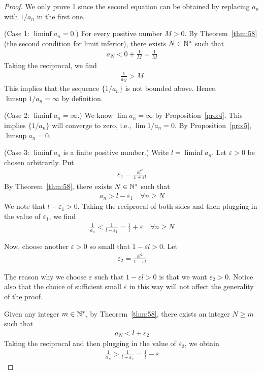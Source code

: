 \documentclass[thmcnt=section, 12pt]{my-elegantbook}
\begin{document}
\begin{proof}
    We only prove 1 since the second equation can be obtained by replacing $a_n$ with $1 / a_n$ in the first one. 

    (Case 1: $\liminf a_n = 0$.) For every positive number $M > 0$. By Theorem~\ref{thm:58} (the second condition for limit inferior), there exists $N \in \mathbb{N}^\ast$ such that 
    \begin{align*}
        a_N < 0 + \frac{1}{M} = \frac{1}{M}
    \end{align*}
    Taking the reciprocal, we find
    \begin{align*}
        \frac{1}{a_N} > M
    \end{align*}
    This implies that the sequence $\{1 / a_n\}$ is not bounded above. Hence, $\limsup 1 / a_n = \infty$ by definition.

    (Case 2: $\liminf a_n = \infty$.) We know $\lim a_n = \infty$ by Proposition~\ref{pro:4}. This implies $\{1 / a_n\}$ will converge to zero, i.e., $\lim 1 / a_n = 0$. By Proposition~\ref{pro:5}, $\limsup a_n = 0$.

    (Case 3: $\liminf a_n$ is a finite positive number.) Write $l = \liminf a_n$. Let $\varepsilon > 0$ be chosen arbitrarily. Put 
    \begin{align*}
        \varepsilon_1 = \frac{\varepsilon l^2}{1 + \varepsilon l}
    \end{align*}
    By Theorem~\ref{thm:58}, there exists $N \in \mathbb{N}^\ast$ such that 
    \begin{align*}
        a_n > l - \varepsilon_1
        \quad \forall n \geq N
    \end{align*}
    We note that $l - \varepsilon_1 > 0$. Taking the reciprocal of both sides and then plugging in the value of $\varepsilon_1$, we find 
    \begin{align}
        \frac{1}{a_n} < \frac{1}{l - \varepsilon_1}
        = \frac{1}{l} + \varepsilon
        \quad
        \forall n \geq N
        \label{eq:123}
    \end{align}

    Now, choose another $\varepsilon > 0$ so small that $1 - \varepsilon l  > 0$. Let
    \begin{align*}
        \varepsilon_2 = \frac{\varepsilon l^2}{1 - \varepsilon l}
    \end{align*}
    \begin{note}
        The reason why we choose $\varepsilon$ such that $1 - \varepsilon l  > 0$ is that we want $\varepsilon_2 > 0$. Notice also that the choice of sufficient small $\varepsilon$ in this way will not affect the generality of the proof.
    \end{note}
    \noindent Given any integer $m \in \mathbb{N}^\ast$, by Theorem~\ref{thm:58}, there exists an integer $N \geq m$ such that 
    \begin{align*}
        a_N < l + \varepsilon_2
    \end{align*}
    Taking the reciprocal and then plugging in the value of $\varepsilon_2$, we obtain
    \begin{align}
        \frac{1}{a_N} > \frac{1}{l + \varepsilon_2}
        = \frac{1}{l} - \varepsilon
        \label{eq:124}
    \end{align}


\end{proof}
\end{document}
